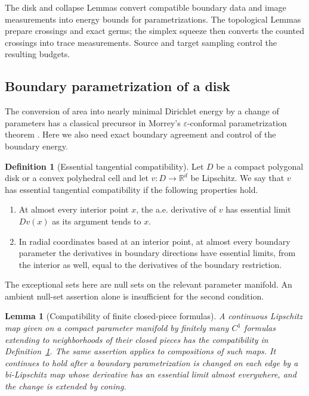 \documentclass[11pt]{article}
\numberwithin{equation}{section}
\newtheorem{lemma}[theorem]{Lemma}
\theoremstyle{definition}
\newtheorem{definition}[theorem]{Definition}
\theoremstyle{remark}
\newcommand{\R}{\mathbb R}
\begin{document}
The disk and collapse Lemmas convert compatible boundary data and image
measurements into energy bounds for parametrizations.  The topological
Lemmas prepare crossings and exact germs; the simplex squeeze then
converts the counted crossings into trace measurements.  Source and
target sampling control the resulting budgets.

\subsection{Boundary parametrization of a disk}

The conversion of area into nearly minimal Dirichlet energy by a
change of parameters has a classical precursor in Morrey's
$\varepsilon$-conformal parametrization theorem
\cite[Chapter~I, Section~9, Theorem~1.2]{Morrey1948}. Here we also
need exact boundary agreement and control of the boundary energy.

\begin{definition}[Essential tangential compatibility]
\label{lt:compatibility}
Let $D$ be a compact polygonal disk or a convex polyhedral cell and let
$v:D\to\R^d$ be Lipschitz.  We say that $v$ has essential tangential
compatibility if the following properties hold.
\begin{enumerate}
\item At almost every interior point $x$, the a.e. derivative of $v$ has
essential limit $Dv(x)$ as its argument tends to $x$.
\item In radial coordinates based at an interior point, at almost every
boundary parameter the derivatives in boundary directions have essential
limits, from the interior as well, equal to the derivatives of the
boundary restriction.
\end{enumerate}
The exceptional sets here are null sets on the relevant parameter
manifold.  An ambient null-set assertion alone is insufficient for the
second condition.
\end{definition}

\begin{lemma}[Compatibility of finite closed-piece formulas]
\label{lt:closed-pieces}
A continuous Lipschitz map given on a compact parameter manifold by
finitely many $C^1$ formulas extending to neighborhoods of their closed
pieces has the compatibility in Definition~\ref{lt:compatibility}.
The same assertion applies to compositions of such maps.  It continues
to hold after a boundary parametrization is changed on each edge by a
bi-Lipschitz map whose derivative has an essential limit almost
everywhere, and the change is extended by coning.
\end{lemma}
\end{document}
